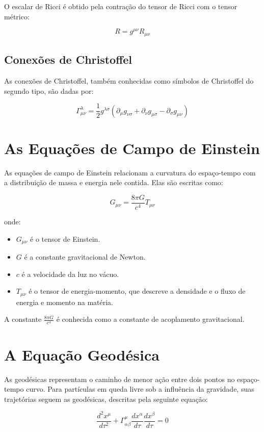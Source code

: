 \documentclass[a4paper,12pt]{article}
\begin{document}
O escalar de Ricci é obtido pela contração do tensor de Ricci com o tensor métrico:

$$R = g^{\mu\nu}R_{\mu\nu}$$

\subsection{Conexões de Christoffel}

As conexões de Christoffel, também conhecidas como símbolos de Christoffel do segundo tipo, são dadas por:

$$\Gamma^\lambda_{\mu\nu} = \frac{1}{2} g^{\lambda\sigma} \left( \partial_\mu g_{\nu\sigma} + \partial_\nu g_{\mu\sigma} - \partial_\sigma g_{\mu\nu} \right)$$

\section{As Equações de Campo de Einstein}

As equações de campo de Einstein relacionam a curvatura do espaço-tempo com a distribuição de massa e energia nele contida. Elas são escritas como:

$$G_{\mu\nu} = \frac{8\pi G}{c^4} T_{\mu\nu}$$

onde:
\begin{itemize}
    \item $G_{\mu\nu}$ é o tensor de Einstein.
    \item $G$ é a constante gravitacional de Newton.
    \item $c$ é a velocidade da luz no vácuo.
    \item $T_{\mu\nu}$ é o tensor de energia-momento, que descreve a densidade e o fluxo de energia e momento na matéria.
\end{itemize}

A constante $\frac{8\pi G}{c^4}$ é conhecida como a constante de acoplamento gravitacional.

\section{A Equação Geodésica}

As geodésicas representam o caminho de menor ação entre dois pontos no espaço-tempo curvo. Para partículas em queda livre sob a influência da gravidade, suas trajetórias seguem as geodésicas, descritas pela seguinte equação:

$$\frac{d^2x^\mu}{d\tau^2} + \Gamma^\mu_{\alpha\beta} \frac{dx^\alpha}{d\tau} \frac{dx^\beta}{d\tau} = 0$$
\end{document}
